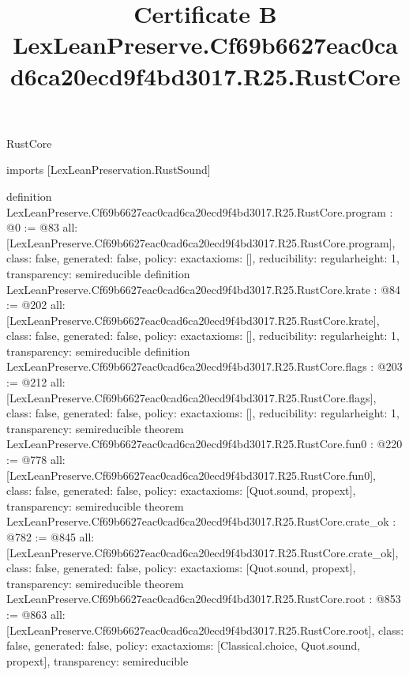\begin{lexlean}{RustCore}
\title{Certificate B LexLeanPreserve.Cf69b6627eac0cad6ca20ecd9f4bd3017.R25.RustCore}
\begin{coremodule}
imports [LexLeanPreservation.RustSound]

definition LexLeanPreserve.Cf69b6627eac0cad6ca20ecd9f4bd3017.R25.RustCore.program : @0 := @83 {
  all: [LexLeanPreserve.Cf69b6627eac0cad6ca20ecd9f4bd3017.R25.RustCore.program],
  class: false,
  generated: false,
  policy: exact{axioms: []},
  reducibility: regular{height: 1},
  transparency: semireducible
}
definition LexLeanPreserve.Cf69b6627eac0cad6ca20ecd9f4bd3017.R25.RustCore.krate : @84 := @202 {
  all: [LexLeanPreserve.Cf69b6627eac0cad6ca20ecd9f4bd3017.R25.RustCore.krate],
  class: false,
  generated: false,
  policy: exact{axioms: []},
  reducibility: regular{height: 1},
  transparency: semireducible
}
definition LexLeanPreserve.Cf69b6627eac0cad6ca20ecd9f4bd3017.R25.RustCore.flags : @203 := @212 {
  all: [LexLeanPreserve.Cf69b6627eac0cad6ca20ecd9f4bd3017.R25.RustCore.flags],
  class: false,
  generated: false,
  policy: exact{axioms: []},
  reducibility: regular{height: 1},
  transparency: semireducible
}
theorem LexLeanPreserve.Cf69b6627eac0cad6ca20ecd9f4bd3017.R25.RustCore.fun0 : @220 := @778 {
  all: [LexLeanPreserve.Cf69b6627eac0cad6ca20ecd9f4bd3017.R25.RustCore.fun0],
  class: false,
  generated: false,
  policy: exact{axioms: [Quot.sound, propext]},
  transparency: semireducible
}
theorem LexLeanPreserve.Cf69b6627eac0cad6ca20ecd9f4bd3017.R25.RustCore.crate_ok : @782 := @845 {
  all: [LexLeanPreserve.Cf69b6627eac0cad6ca20ecd9f4bd3017.R25.RustCore.crate_ok],
  class: false,
  generated: false,
  policy: exact{axioms: [Quot.sound, propext]},
  transparency: semireducible
}
theorem LexLeanPreserve.Cf69b6627eac0cad6ca20ecd9f4bd3017.R25.RustCore.root : @853 := @863 {
  all: [LexLeanPreserve.Cf69b6627eac0cad6ca20ecd9f4bd3017.R25.RustCore.root],
  class: false,
  generated: false,
  policy: exact{axioms: [Classical.choice, Quot.sound, propext]},
  transparency: semireducible
}


\end{coremodule}
\end{lexlean}
